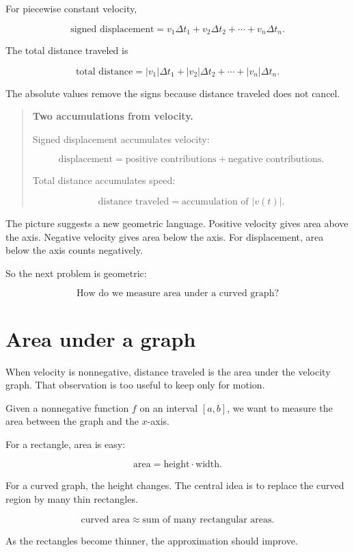 For piecewise constant velocity,

\[
\text{signed displacement}
=
v_1\Delta t_1+v_2\Delta t_2+\cdots+v_n\Delta t_n.
\]

The total distance traveled is

\[
\text{total distance}
=
|v_1|\Delta t_1+|v_2|\Delta t_2+\cdots+|v_n|\Delta t_n.
\]

The absolute values remove the signs because distance traveled does not cancel.

\begin{quote}
\textbf{Two accumulations from velocity.}

Signed displacement accumulates velocity:

\[
\text{displacement}=\text{positive contributions}+\text{negative contributions}.
\]

Total distance accumulates speed:

\[
\text{distance traveled}=\text{accumulation of } |v(t)|.
\]
\end{quote}

The picture suggests a new geometric language.  Positive velocity gives area above
the axis.  Negative velocity gives area below the axis.  For displacement, area below
the axis counts negatively.

So the next problem is geometric:

\[
\text{How do we measure area under a curved graph?}
\]

\section{Area under a graph}
\label{sec:area-under-a-graph}

When velocity is nonnegative, distance traveled is the area under the velocity graph.
That observation is too useful to keep only for motion.

Given a nonnegative function \(f\) on an interval \([a,b]\), we want to measure the area
between the graph and the \(x\)-axis.

For a rectangle, area is easy:

\[
\text{area}=\text{height}\cdot\text{width}.
\]

For a curved graph, the height changes.  The central idea is to replace the curved
region by many thin rectangles.

\[
\text{curved area}
\approx
\text{sum of many rectangular areas}.
\]

As the rectangles become thinner, the approximation should improve.

